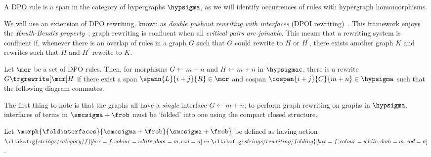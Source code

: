A DPO rule is a span in the category of hypergraphs \(\hypsigma\), as we will
identify occurrences of rules with hypergraph homomorphisms.

We will use an extension of DPO rewriting, known as
\emph{double pushout rewriting with interfaces}
(DPOI rewriting)~\cite{bonchi2017confluence}.
This framework enjoys the \emph{Knuth-Bendix property}~\cite{knuth1970simple};
graph rewriting is confluent when all \emph{critical pairs are joinable}.
This means that a rewriting system is confluent if, whenever
there is an overlap of rules in a graph \(G\) such that \(G\) could rewrite to
\(H\) or \(H^\prime\), there exists another graph \(K\) and rewrites
such that \(H\) and \(H^\prime\) rewrite to \(K\).

\begin{definition}\label{def:dpo-rewriting}
    Let \(\mcr\) be a set of DPO rules.
    Then, for morphisms \(G \leftarrow m + n\) and
    \(H \leftarrow m + n\) in
    \(\hypsigmac\), there is a rewrite \(G \trgrewrite[\mcr] H\) if there
    exist a span \(
    \spann{L}{i + j}{R} \in \mcr
    \) and cospan \(
    \cospan{i + j}{C}{m + n} \in \hypsigma
    \) such that the following diagram commutes.
    \begin{center}
    \end{center}
\end{definition}

The first thing to note is that the graphs all have a \emph{single} interface
\(G \leftarrow m + n\); to perform graph rewriting on graphs in
\(\hypsigma\), interfaces of terms in \(\smcsigma + \frob\) must be `folded'
into one using the compact closed structure.

\begin{definition}\label{def:fold-interfaces}
    Let \(\morph{\foldinterfaces}{\smcsigma + \frob}{\smcsigma + \frob}\)
    be defined as having action \(
    \iltikzfig{strings/category/f}[box=f,colour=white,dom=m,cod=n]
    \mapsto
    \iltikzfig{strings/rewriting/folding}[box=f,colour=white,dom=m,cod=n]
    \).
\end{definition}

